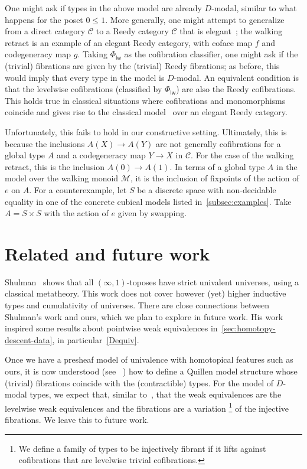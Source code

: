 \documentclass[10pt,a4paper,draft]{article}
\newcommand{\CC}{{\mathcal C}}
\newcommand{\D}{D}              %
\renewcommand{\~}{\widetilde}
\newcommand{\levelwise}{\mathsf{lw}}
\newcommand{\cofunivLW}{\Phi_{\levelwise}}
\newcommand{\M}{\mathcal{M}}
\theoremstyle{definition}
\theoremstyle{remark} %
\begin{document}
\medskip

One might ask if types in the above model are already $\D$\hyp{}modal, similar to what happens for the poset $0 \leqslant 1$.
More generally, one might attempt to generalize from a direct category $\CC$ to a Reedy category $\CC$ that is elegant~\cite{BergnerR13}; the walking retract is an example of an elegant Reedy category, with coface map $f$ and codegeneracy map $g$.
Taking $\cofunivLW$ as the cofibration classifier, one might ask if the (trivial) fibrations are given by the (trivial) Reedy fibrations; as before, this would imply that every type in the model is $\D$\hyp{}modal.
An equivalent condition is that the levelwise cofibrations (classified by $\cofunivLW$) are also the Reedy cofibrations.
This holds true in classical situations where cofibrations and monomorphisms coincide and gives rise to the classical model~\cite{Shulman13} over an elegant Reedy category.

Unfortunately, this fails to hold in our constructive setting.
Ultimately, this is because the inclusions $A(X) \to A(Y)$ are not generally cofibrations for a global type $A$ and a codegeneracy map $Y \to X$ in $\CC$.
For the case of the walking retract, this is the inclusion $A(0) \to A(1)$.
In terms of a global type $A$ in the model over the walking monoid $\M$, it is the inclusion of fixpoints of the action of $e$ on $A$.
For a counterexample, let $S$ be a discrete space with non-decidable equality in one of the concrete cubical models listed in~\cref{subsec:examples}.
Take $A = S \times S$ with the action of $e$ given by swapping.

\section{Related and future work}

Shulman~\cite{Shulman19} shows that all $(\infty,1)$\hyp{}toposes have strict univalent universes, using a classical metatheory.
This work does not cover however (yet) higher inductive types and cumulativity of universes.
There are close connections between Shulman's work and ours, which we plan to explore in future work.
His work inspired some results about pointwise weak equivalences in~\cref{sec:homotopy-descent-data}, in particular~\cref{Dequiv}.

Once we have a presheaf model of univalence with homotopical features such as ours, it is now understood (see \eg~\cite{Sattler17,Boulier18}) how to define a Quillen model structure whose (trivial) fibrations coincide with the (contractible) types.
For the model of $\D$\hyp{}modal types, we expect that, similar to~\cite{Shulman19}, that the weak equivalences are the levelwise weak equivalences and the fibrations are a variation%
\footnote{We define a family of types to be injectively fibrant if it lifts against cofibrations that are levelwise trivial cofibrations.}
of the injective fibrations.
We leave this to future work.
\end{document}
